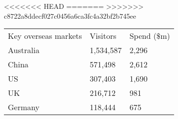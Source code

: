 <<<<<<< HEAD
=======
>>>>>>> c8722a8ddecf027c0456a6ca3fc4a32bf2b745ee
\begin{tabular}[t]{p{5.1cm}>{\hfill}p{1.1cm}>{\hfill}p{1.3cm}}
 Key overseas markets & Visitors & Spend (\$m) \\ 
 Australia & 1,534,587 & 2,296 \\ 
  China &   571,498 & 2,612 \\ 
  US &   307,403 & 1,690 \\ 
  UK &   216,712 & 981 \\ 
  Germany &   118,444 & 675 \\ 
  \end{tabular}
